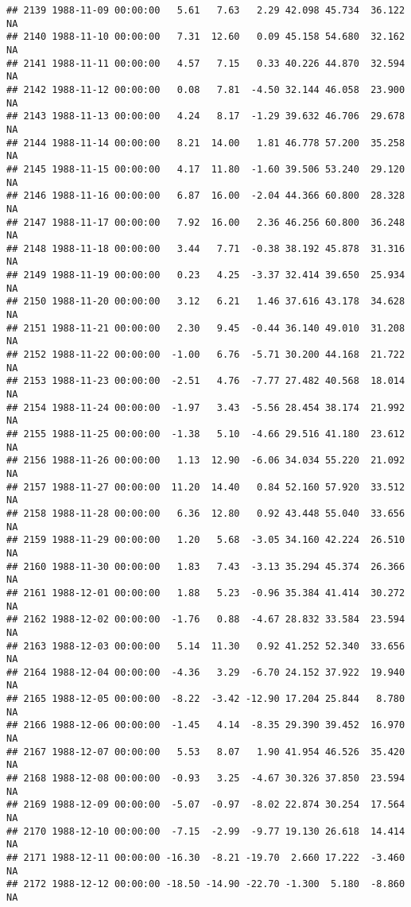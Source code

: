 \documentclass{article}\usepackage{graphicx, color}
\makeatletter
\newenvironment{kframe}{%
 \def\at@end@of@kframe{}%
 \ifinner\ifhmode%
  \def\at@end@of@kframe{\end{minipage}}%
  \begin{minipage}{\columnwidth}%
 \fi\fi%
 \def\FrameCommand##1{\hskip\@totalleftmargin \hskip-\fboxsep
 \colorbox{shadecolor}{##1}\hskip-\fboxsep
     \hskip-\linewidth \hskip-\@totalleftmargin \hskip\columnwidth}%
 \MakeFramed {\advance\hsize-\width
   \@totalleftmargin\z@ \linewidth\hsize
   \@setminipage}}%
 {\par\unskip\endMakeFramed%
 \at@end@of@kframe}
\newenvironment{knitrout}{}{} %
\makeatother
\begin{document}
\begin{knitrout}
\begin{kframe}
\begin{verbatim}
## 2139 1988-11-09 00:00:00   5.61   7.63   2.29 42.098 45.734  36.122     NA
## 2140 1988-11-10 00:00:00   7.31  12.60   0.09 45.158 54.680  32.162     NA
## 2141 1988-11-11 00:00:00   4.57   7.15   0.33 40.226 44.870  32.594     NA
## 2142 1988-11-12 00:00:00   0.08   7.81  -4.50 32.144 46.058  23.900     NA
## 2143 1988-11-13 00:00:00   4.24   8.17  -1.29 39.632 46.706  29.678     NA
## 2144 1988-11-14 00:00:00   8.21  14.00   1.81 46.778 57.200  35.258     NA
## 2145 1988-11-15 00:00:00   4.17  11.80  -1.60 39.506 53.240  29.120     NA
## 2146 1988-11-16 00:00:00   6.87  16.00  -2.04 44.366 60.800  28.328     NA
## 2147 1988-11-17 00:00:00   7.92  16.00   2.36 46.256 60.800  36.248     NA
## 2148 1988-11-18 00:00:00   3.44   7.71  -0.38 38.192 45.878  31.316     NA
## 2149 1988-11-19 00:00:00   0.23   4.25  -3.37 32.414 39.650  25.934     NA
## 2150 1988-11-20 00:00:00   3.12   6.21   1.46 37.616 43.178  34.628     NA
## 2151 1988-11-21 00:00:00   2.30   9.45  -0.44 36.140 49.010  31.208     NA
## 2152 1988-11-22 00:00:00  -1.00   6.76  -5.71 30.200 44.168  21.722     NA
## 2153 1988-11-23 00:00:00  -2.51   4.76  -7.77 27.482 40.568  18.014     NA
## 2154 1988-11-24 00:00:00  -1.97   3.43  -5.56 28.454 38.174  21.992     NA
## 2155 1988-11-25 00:00:00  -1.38   5.10  -4.66 29.516 41.180  23.612     NA
## 2156 1988-11-26 00:00:00   1.13  12.90  -6.06 34.034 55.220  21.092     NA
## 2157 1988-11-27 00:00:00  11.20  14.40   0.84 52.160 57.920  33.512     NA
## 2158 1988-11-28 00:00:00   6.36  12.80   0.92 43.448 55.040  33.656     NA
## 2159 1988-11-29 00:00:00   1.20   5.68  -3.05 34.160 42.224  26.510     NA
## 2160 1988-11-30 00:00:00   1.83   7.43  -3.13 35.294 45.374  26.366     NA
## 2161 1988-12-01 00:00:00   1.88   5.23  -0.96 35.384 41.414  30.272     NA
## 2162 1988-12-02 00:00:00  -1.76   0.88  -4.67 28.832 33.584  23.594     NA
## 2163 1988-12-03 00:00:00   5.14  11.30   0.92 41.252 52.340  33.656     NA
## 2164 1988-12-04 00:00:00  -4.36   3.29  -6.70 24.152 37.922  19.940     NA
## 2165 1988-12-05 00:00:00  -8.22  -3.42 -12.90 17.204 25.844   8.780     NA
## 2166 1988-12-06 00:00:00  -1.45   4.14  -8.35 29.390 39.452  16.970     NA
## 2167 1988-12-07 00:00:00   5.53   8.07   1.90 41.954 46.526  35.420     NA
## 2168 1988-12-08 00:00:00  -0.93   3.25  -4.67 30.326 37.850  23.594     NA
## 2169 1988-12-09 00:00:00  -5.07  -0.97  -8.02 22.874 30.254  17.564     NA
## 2170 1988-12-10 00:00:00  -7.15  -2.99  -9.77 19.130 26.618  14.414     NA
## 2171 1988-12-11 00:00:00 -16.30  -8.21 -19.70  2.660 17.222  -3.460     NA
## 2172 1988-12-12 00:00:00 -18.50 -14.90 -22.70 -1.300  5.180  -8.860     NA

\end{verbatim}
\end{kframe}
\end{knitrout}
\end{document}
